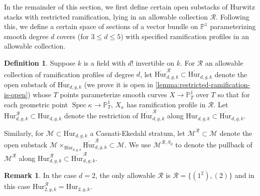 \documentclass[12 pt]{amsart}
\newcommand{\rboxed}[1]{#1}
\theoremstyle{plain}
\theoremstyle{definition}
\newtheorem{definition}[theorem]{Definition}
\newtheorem{remark}[theorem]{Remark}
\theoremstyle{remark}
\numberwithin{equation}{section}
\newcommand\bp{\mathbb P}
\DeclareMathOperator\spec{\operatorname{Spec}}
\newcommand\bighurg[3]{\overline{\mathrm{Hur}}_{#1,#2, #3}} %
\newcommand\bigrhur[4]{\overline{\mathrm{Hur}}_{#1,#2, #3}^{#4}} %
\newcommand\hur[3]{\mathrm{Hur}_{#1,#2,#3}} %
\newcommand\rhur[4]{\mathrm{Hur}_{#1,#2,#3}^{#4}} %
\newcommand\ce{\mathscr M} %
\newcommand\rce[1]{\mathscr M^{#1}} %
\begin{document}
In the remainder of this section, we first define certain open 
substacks of Hurwitz stacks with restricted
ramification, lying in an allowable collection $\mathcal R$.
Following this, we define a certain space of sections of a vector bundle on
$\bp^1$
parameterizing smooth degree $d$ covers (for $3 \leq d \leq 5$) with specified
ramification profiles in an allowable collection.

\begin{definition} \label{definition:rhur} 
	Suppose $k$ is a field with $d!$ invertible on $k$.
	For $\mathcal R$ an allowable collection
	of ramification profiles of degree $d$, let 
$\bigrhur d g k {\mathcal R} \subset \bighurg d g k$ 
denote the open substack of $\bighurg d g
k$ (we prove it is open in \autoref{lemma:restricted-ramification-is-open}) whose $T$ points parameterize smooth curves $X \to \bp^1_T$ over $T$
	so that for each geometric point $\spec \kappa \to \bp^1_T$,
	$X_{\kappa}$ has ramification profile in $\mathcal R$.
	Let
	$\rboxed{\rhur d g k {\mathcal R}} \subset \hur d g k$
	denote the restriction of $\bigrhur d g k {\mathcal R}$ along
	$\hur d g k \subset \bighurg d g k$.

	Similarly, for $\ce \subset \bighurg d g k$ a Casnati-Ekedahl stratum,
let $\rboxed{ \rce{\mathcal R} } \subset \ce$ denote the open substack $\ce
\times_{\bighurg d g k} \bigrhur d g k {\mathcal R} \subset \ce$.
We use 
$\ce^{\mathcal R, S_d}$ to denote the pullback of $\ce^{\mathcal R}$ along
$\rhur d g k {\mathcal R}
\subset \bigrhur d g k{\mathcal R}$.
\end{definition}
\begin{remark}
	\label{remark:}
	In the case $d = 2$, the only allowable $\mathcal R$ is $\mathcal R =
\{(1^2), (2)\}$ and in this case $\rboxed{\rhur 2 g k {\mathcal R}}
= \hur 2 g k$.  
\end{remark}
\end{document}
